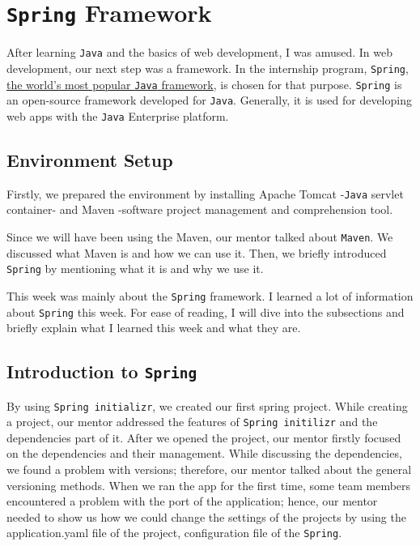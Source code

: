 \section{\texttt{Spring} Framework}

After learning \texttt{Java} and the basics of web development, I was amused. In web development, our next step was a framework. In the internship program, \texttt{Spring}, \href{https://spring.io/why-spring}{the world's most popular \texttt{Java} framework}, is chosen for that purpose. \texttt{Spring} is an open-source framework developed for \texttt{Java}. Generally, it is used for developing web apps with the \texttt{Java} Enterprise platform.

\subsection{Environment Setup}

Firstly, we prepared the environment by installing Apache Tomcat -\texttt{Java} servlet container- and Maven -software project management and comprehension tool. 

Since we will have been using the Maven, our mentor talked about \texttt{Maven}. We discussed what Maven is and how we can use it. Then, we briefly introduced \texttt{Spring} by mentioning what it is and why we use it.

This week was mainly about the \texttt{Spring} framework. I learned a lot of information about \texttt{Spring} this week. For ease of reading, I will dive into the subsections and briefly explain what I learned this week and what they are.

\subsection{Introduction to \texttt{Spring}}

By using \texttt{Spring initializr}, we created our first spring project. While creating a project, our mentor addressed the features of \texttt{Spring initilizr} and the dependencies part of it. After we opened the project, our mentor firstly focused on the dependencies and their management. While discussing the dependencies, we found a problem with versions; therefore, our mentor talked about the general versioning methods. When we ran the app for the first time, some team members encountered a problem with the port of the application; hence, our mentor needed to show us how we could change the settings of the projects by using the application.yaml file of the project, configuration file of the \texttt{Spring}.

